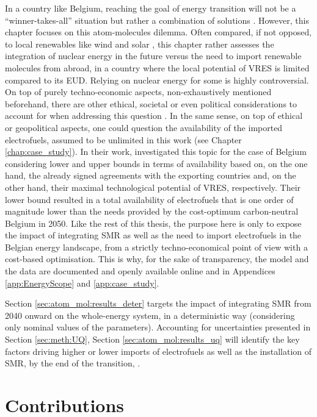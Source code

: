 In a country like Belgium, reaching the goal of energy transition will not be a ``winner-takes-all'' situation but rather a combination of solutions \cite{Limpens2020,limpens2021generating}. However, this chapter focuses on this atom-molecules dilemma. Often compared, if not opposed, to local renewables like wind and solar \cite{suna2016nuclear,khatib2016economics}, this chapter rather assesses the integration of nuclear energy in the future versus the need to import renewable molecules from abroad, in a country where the local potential of \gls{VRES} is limited compared to its \gls{EUD}. Relying on nuclear energy for some is highly controversial. On top of purely techno-economic aspects, non-exhaustively mentioned beforehand, there are other ethical, societal or even political considerations to account for when addressing this question \cite{kempf2022}. In the same sense, on top of ethical or geopolitical aspects, one could question the availability of the imported electrofuels, assumed to be unlimited in this work (see Chapter \ref{chap:case_study}). In their work, \citet{lefebvre2022electrofuel} investigated this topic for the case of Belgium considering lower and upper bounds in terms of availability based on, on the one hand, the already signed agreements with the exporting countries and, on the other hand, their maximal technological potential of \gls{VRES}, respectively. Their lower bound resulted in a total availability of electrofuels that is one order of magnitude lower than the needs provided by the cost-optimum carbon-neutral Belgium in 2050. Like the rest of this thesis, the purpose here is only to expose the impact of integrating \gls{SMR} as well as the need to import electrofuels in the Belgian energy landscape, from a strictly techno-economical point of view with a cost-based optimisation. This is why, for the sake of transparency, the model and the data are documented and openly available online \cite{readthedocs_pathway} and in Appendices \ref{app:EnergyScope} and \ref{app:case_study}.

Section \ref{sec:atom_mol:results_deter} targets the impact of integrating \gls{SMR} from 2040 onward on the whole-energy system, in a deterministic way (\ie considering only nominal values of the parameters). Accounting for uncertainties presented in Section \ref{sec:meth:UQ}, Section \ref{sec:atom_mol:results_uq} will identify the key factors driving higher or lower imports of electrofuels as well as the installation of \gls{SMR}, by the end of the transition, .

\section*{Contributions}
\label{sec:atom_mol:contributions}


